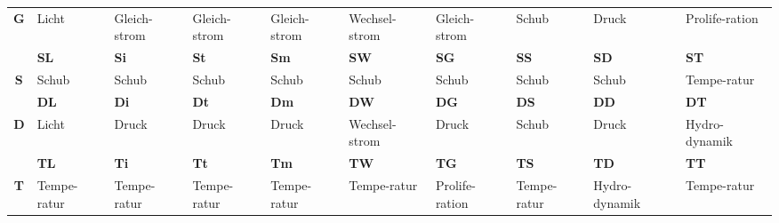 \begin{landscape}
\begin{table}[hbt]
\begin{threeparttable}
\begin{tabularx}{\linewidth}{c|XXXXXXXXX}
			\multirow{-2}{*}{\textbf{G}} &
			\cellcolor[HTML]{32CB00}Licht &
			\cellcolor[HTML]{4156EE}Gleich-strom &
			\cellcolor[HTML]{4156EE}Gleich-strom &
			\cellcolor[HTML]{4156EE}Gleich-strom &
			\cellcolor[HTML]{54C1F2}Wechsel-strom &
			\cellcolor[HTML]{4156EE}Gleich-strom &
			\cellcolor[HTML]{F8FF00}Schub &
			\cellcolor[HTML]{FFCB2F}Druck &
			\cellcolor[HTML]{9B68F2}Prolife-ration \\
			&
			\cellcolor[HTML]{F8FF00}\textbf{SL} &
			\cellcolor[HTML]{F8FF00}\textbf{Si} &
			\cellcolor[HTML]{F8FF00}\textbf{St} &
			\cellcolor[HTML]{F8FF00}\textbf{Sm} &
			\cellcolor[HTML]{F8FF00}\textbf{SW} &
			\cellcolor[HTML]{F8FF00}\textbf{SG} &
			\cellcolor[HTML]{F8FF00}\textbf{SS} &
			\cellcolor[HTML]{F8FF00}\textbf{SD} &
			\cellcolor[HTML]{FB0404}\textbf{ST} \\
			\multirow{-2}{*}{\textbf{S}} &
			\cellcolor[HTML]{F8FF00}Schub &
			\cellcolor[HTML]{F8FF00}Schub &
			\cellcolor[HTML]{F8FF00}Schub &
			\cellcolor[HTML]{F8FF00}Schub &
			\cellcolor[HTML]{F8FF00}Schub &
			\cellcolor[HTML]{F8FF00}Schub &
			\cellcolor[HTML]{F8FF00}Schub &
			\cellcolor[HTML]{F8FF00}Schub &
			\cellcolor[HTML]{FB0404}Tempe-ratur \\
			&
			\cellcolor[HTML]{32CB00}\textbf{DL} &
			\cellcolor[HTML]{FFCB2F}\textbf{Di} &
			\cellcolor[HTML]{FFCB2F}\textbf{Dt} &
			\cellcolor[HTML]{FFCB2F}\textbf{Dm} &
			\cellcolor[HTML]{54C1F2}\textbf{DW} &
			\cellcolor[HTML]{FFCB2F}\textbf{DG} &
			\cellcolor[HTML]{F8FF00}\textbf{DS} &
			\cellcolor[HTML]{FFCB2F}\textbf{DD} &
			\cellcolor[HTML]{DF812B}\textbf{DT} \\
			\multirow{-2}{*}{\textbf{D}} &
			\cellcolor[HTML]{32CB00}Licht &
			\cellcolor[HTML]{FFCB2F}Druck &
			\cellcolor[HTML]{FFCB2F}Druck &
			\cellcolor[HTML]{FFCB2F}Druck &
			\cellcolor[HTML]{54C1F2}Wechsel-strom &
			\cellcolor[HTML]{FFCB2F}Druck &
			\cellcolor[HTML]{F8FF00}Schub &
			\cellcolor[HTML]{FFCB2F}Druck &
			\cellcolor[HTML]{DF812B}Hydro-dynamik \\
			&
			\cellcolor[HTML]{FB0404}\textbf{TL} &
			\cellcolor[HTML]{FB0404}\textbf{Ti} &
			\cellcolor[HTML]{FB0404}\textbf{Tt} &
			\cellcolor[HTML]{FB0404}\textbf{Tm} &
			\cellcolor[HTML]{FB0404}\textbf{TW} &
			\cellcolor[HTML]{9B68F2}\textbf{TG} &
			\cellcolor[HTML]{FB0404}\textbf{TS} &
			\cellcolor[HTML]{DF812B}\textbf{TD} &
			\cellcolor[HTML]{FB0404}\textbf{TT} \\
			\multirow{-2}{*}{\textbf{T}} &
			\cellcolor[HTML]{FB0404}Tempe-ratur &
			\cellcolor[HTML]{FB0404}Tempe-ratur &
			\cellcolor[HTML]{FB0404}Tempe-ratur &
			\cellcolor[HTML]{FB0404}Tempe-ratur &
			\cellcolor[HTML]{FB0404}Tempe-ratur &
			\cellcolor[HTML]{9B68F2}Prolife-ration &
			\cellcolor[HTML]{FB0404}Tempe-ratur &
			\cellcolor[HTML]{DF812B}Hydro-dynamik &
			\cellcolor[HTML]{FB0404}Tempe-ratur \\ \bottomrule
		\end{tabularx}
	\end{threeparttable} 
\end{table}
\end{landscape}

